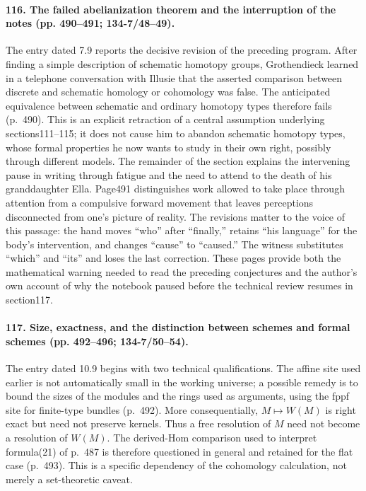 \paragraph{116. The failed abelianization theorem and the interruption of the notes (pp. 490--491; 134-7/48--49).}
The entry dated 7.9 reports the decisive revision of the preceding program. After finding a simple description of schematic homotopy groups, Grothendieck learned in a telephone conversation with Illusie that the asserted comparison between discrete and schematic homology or cohomology was false. The anticipated equivalence between schematic and ordinary homotopy types therefore fails (p.~490). This is an explicit retraction of a central assumption underlying sections111--115; it does not cause him to abandon schematic homotopy types, whose formal properties he now wants to study in their own right, possibly through different models. The remainder of the section explains the intervening pause in writing through fatigue and the need to attend to the death of his granddaughter Ella. Page491 distinguishes work allowed to take place through attention from a compulsive forward movement that leaves perceptions disconnected from one's picture of reality. The revisions matter to the voice of this passage: the hand moves ``who'' after ``finally,'' retains ``his language'' for the body's intervention, and changes ``cause'' to ``caused.'' The witness substitutes ``which'' and ``its'' and loses the last correction. These pages provide both the mathematical warning needed to read the preceding conjectures and the author's own account of why the notebook paused before the technical review resumes in section117.

\paragraph{117. Size, exactness, and the distinction between schemes and formal schemes (pp. 492--496; 134-7/50--54).}
The entry dated 10.9 begins with two technical qualifications. The affine site used earlier is not automatically small in the working universe; a possible remedy is to bound the sizes of the modules and the rings used as arguments, using the fppf site for finite-type bundles (p.~492). More consequentially, $M\mapsto W(M)$ is right exact but need not preserve kernels. Thus a free resolution of $M$ need not become a resolution of $W(M)$. The derived-Hom comparison used to interpret formula(21) of p.~487 is therefore questioned in general and retained for the flat case (p.~493). This is a specific dependency of the cohomology calculation, not merely a set-theoretic caveat.

